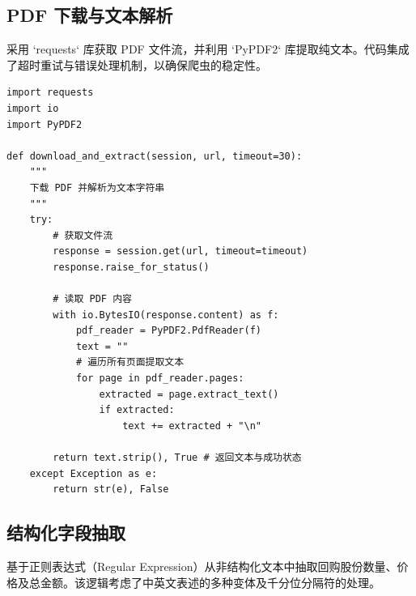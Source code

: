 \documentclass[a4paper,10pt]{article}
\begin{document}
\subsection{PDF 下载与文本解析}

采用 `requests` 库获取 PDF 文件流，并利用 `PyPDF2` 库提取纯文本。代码集成了超时重试与错误处理机制，以确保爬虫的稳定性。

\begin{lstlisting}[caption={PDF下载与文本提取函数}, label={code:pdf_extract}]
import requests
import io
import PyPDF2

def download_and_extract(session, url, timeout=30):
    """
    下载 PDF 并解析为文本字符串
    """
    try:
        # 获取文件流
        response = session.get(url, timeout=timeout)
        response.raise_for_status()

        # 读取 PDF 内容
        with io.BytesIO(response.content) as f:
            pdf_reader = PyPDF2.PdfReader(f)
            text = ""
            # 遍历所有页面提取文本
            for page in pdf_reader.pages:
                extracted = page.extract_text()
                if extracted:
                    text += extracted + "\n"
        
        return text.strip(), True # 返回文本与成功状态
    except Exception as e:
        return str(e), False
\end{lstlisting}

\subsection{结构化字段抽取}

基于正则表达式（Regular Expression）从非结构化文本中抽取回购股份数量、价格及总金额。该逻辑考虑了中英文表述的多种变体及千分位分隔符的处理。
\end{document}
